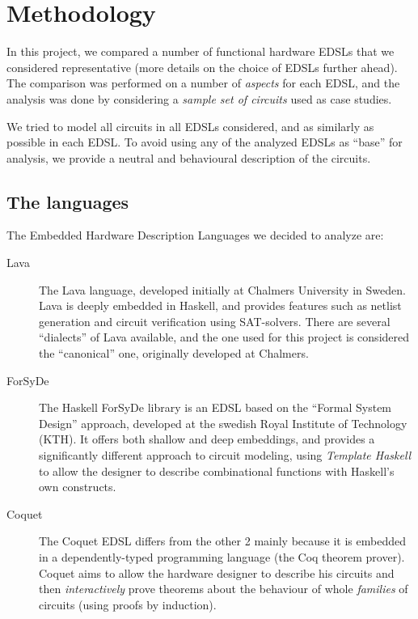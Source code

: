 \section{Methodology}
\label{sec:methods}

    In this project, we compared a number of functional hardware \acp{EDSL} that we considered
    representative (more details on the choice of \acp{EDSL} further ahead). The comparison was
    performed on a number of \emph{aspects} for each \ac{EDSL}, and the analysis was done by
    considering a \emph{sample set of circuits} used as case studies.

    We tried to model all circuits in all \acp{EDSL} considered, and as similarly as possible in each
    EDSL. To avoid using any of the analyzed \acp{EDSL} as ``base'' for analysis, we provide a neutral
    and behavioural description of the circuits.

    \subsection{The languages}
    \label{subsec:languages}
        The Embedded Hardware Description Languages we decided to analyze are:

        \begin{description}
            \item[Lava] The Lava\cite{lava1998} language, developed initially at Chalmers University
            in Sweden.  Lava is deeply embedded in Haskell, and provides features such as netlist
            generation and circuit verification using SAT-solvers. There are several ``dialects'' of
            Lava available, and the one used for this project is considered the ``canonical'' one,
            originally developed at Chalmers.

            \item[ForSyDe] The Haskell ForSyDe library is an \ac{EDSL} based on the ``Formal System
            Design'' approach\cite{forsyde1999}, developed at the swedish Royal Institute of
            Technology (KTH).  It offers both shallow and deep embeddings, and provides a
            significantly different approach to circuit modeling, using \emph{Template Haskell} to
            allow the designer to describe combinational functions with Haskell's own constructs.

            \item[Coquet] The Coquet\cite{coquet2011} \ac{EDSL} differs from the other 2 mainly because
            it is embedded in a dependently-typed programming language (the Coq theorem prover).
            Coquet aims to allow the hardware designer to describe his circuits and then
            \emph{interactively} prove theorems about the behaviour of whole \emph{families} of
            circuits (using proofs by induction).
        \end{description}


